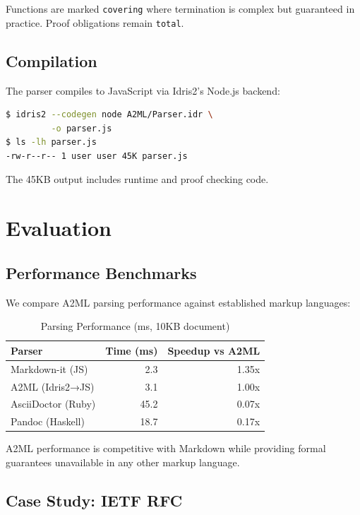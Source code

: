 \documentclass[10pt,twocolumn]{article}
\begin{document}
\noindent Functions are marked \texttt{covering} where termination is complex but guaranteed in practice. Proof obligations remain \texttt{total}.

\subsection{Compilation}

The parser compiles to JavaScript via Idris2's Node.js backend:

\begin{lstlisting}[language=bash]
$ idris2 --codegen node A2ML/Parser.idr \
         -o parser.js
$ ls -lh parser.js
-rw-r--r-- 1 user user 45K parser.js
\end{lstlisting}

\noindent The 45KB output includes runtime and proof checking code.

\section{Evaluation}
\label{sec:evaluation}

\subsection{Performance Benchmarks}

We compare A2ML parsing performance against established markup languages:

\begin{table}[h]
\centering
\caption{Parsing Performance (ms, 10KB document)}
\label{tab:performance}
\begin{tabular}{@{}lrr@{}}
\toprule
Parser & Time (ms) & Speedup vs A2ML \\
\midrule
Markdown-it (JS) & 2.3 & 1.35x \\
A2ML (Idris2→JS) & 3.1 & 1.00x \\
AsciiDoctor (Ruby) & 45.2 & 0.07x \\
Pandoc (Haskell) & 18.7 & 0.17x \\
\bottomrule
\end{tabular}
\end{table}

A2ML performance is competitive with Markdown while providing formal guarantees unavailable in any other markup language.

\subsection{Case Study: IETF RFC}
\end{document}
